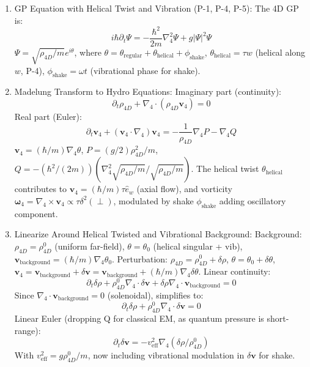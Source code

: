 \begin{enumerate}
\item GP Equation with Helical Twist and Vibration (P-1, P-4, P-5): The 4D GP is:
\[ i \hbar \partial_t \Psi = - \frac{\hbar^2}{2m} \nabla_4^2 \Psi + g |\Psi|^2 \Psi \]
$\Psi = \sqrt{\rho_{4D} / m} e^{i \theta}$, where $\theta = \theta_{\text{regular}} + \theta_{\text{helical}} + \phi_{\text{shake}}$, $\theta_{\text{helical}} = \tau w$ (helical along $w$, P-4), $\phi_{\text{shake}} = \omega t$ (vibrational phase for shake).
\item Madelung Transform to Hydro Equations: Imaginary part (continuity):
\[ \partial_t \rho_{4D} + \nabla_4 \cdot (\rho_{4D} \mathbf{v}_4) = 0 \]
Real part (Euler):
\[ \partial_t \mathbf{v}_4 + (\mathbf{v}_4 \cdot \nabla_4) \mathbf{v}_4 = - \frac{1}{\rho_{4D}} \nabla_4 P - \nabla_4 Q \]
$\mathbf{v}_4 = (\hbar / m) \nabla_4 \theta$, $P = (g / 2) \rho_{4D}^2 / m$, $Q = - (\hbar^2 / (2m)) (\nabla_4^2 \sqrt{\rho_{4D} / m} / \sqrt{\rho_{4D} / m})$. The helical twist $\theta_{\text{helical}}$ contributes to $\mathbf{v}_4 = (\hbar / m) \tau \hat{e}_w$ (axial flow), and vorticity $\boldsymbol{\omega}_4 = \nabla_4 \times \mathbf{v}_4 \propto \tau \delta^2(\perp)$, modulated by shake $\phi_{\text{shake}}$ adding oscillatory component.
\item Linearize Around Helical Twisted and Vibrational Background: Background: $\rho_{4D} = \rho_{4D}^0$ (uniform far-field), $\theta = \theta_0$ (helical singular + vib), $\mathbf{v}_{\text{background}} = (\hbar / m) \nabla_4 \theta_0$. Perturbation: $\rho_{4D} = \rho_{4D}^0 + \delta\rho$, $\theta = \theta_0 + \delta\theta$, $\mathbf{v}_4 = \mathbf{v}_{\text{background}} + \delta\mathbf{v} = \mathbf{v}_{\text{background}} + (\hbar / m) \nabla_4 \delta\theta$. Linear continuity:
\[ \partial_t \delta \rho + \rho_{4D}^0 \nabla_4 \cdot \delta \mathbf{v} + \delta \rho \nabla_4 \cdot \mathbf{v}_{\text{background}} = 0 \]
Since $\nabla_4 \cdot \mathbf{v}_{\text{background}} = 0$ (solenoidal), simplifies to:
\[ \partial_t \delta \rho + \rho_{4D}^0 \nabla_4 \cdot \delta \mathbf{v} = 0 \]
Linear Euler (dropping Q for classical EM, as quantum pressure is short-range):
\[ \partial_t \delta \mathbf{v} = - v_{\text{eff}}^2 \nabla_4 (\delta \rho / \rho_{4D}^0) \]
With $v_{\text{eff}}^2 = g \rho_{4D}^0 / m$, now including vibrational modulation in $\delta \mathbf{v}$ for shake.

\end{enumerate}
